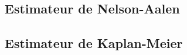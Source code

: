 \documentclass[french, landscape]{article}
\begin{document}
\begin{multicols*}{3}
\subsection*{Estimateur de Nelson-Aalen}

\subsection*{Estimateur de Kaplan-Meier}



\end{multicols*}
\end{document}
